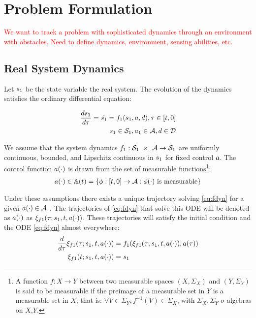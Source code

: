 \section{Problem Formulation \label{sec:formulation}}

\textcolor{red}{We want to track a problem with sophisticated dynamics through an environment with obstacles.  Need to define dynamics, environment, sensing abilities, etc.}

\subsection{Real System Dynamics}
Let $s_1$ be the state variable the real system. The evolution of the dynamics satisfies the ordinary differential equation:

\begin{equation}
\begin{aligned}
\label{eq:fdyn}
\frac{ds_1}{d\tau} = \dot{s_1} = f_1(s_1, a, d), \tau \in [t, 0] \\
s_1 \in \mathcal{S}_1, a_1 \in \mathcal{A}, d \in \mathcal{D}
\end{aligned}
\end{equation}

We assume that the system dynamics $f_1 : \mathcal{S}_1\ \times\ \mathcal{A} \rightarrow \mathcal{S}_1$ are uniformly continuous, bounded, and Lipschitz continuous in $s_1$ for fixed control $a$. The control function $a(\cdot)$ is drawn from the set of measurable functions\footnote{A function $f:X\to Y$ between two measurable spaces $(X,\Sigma_X)$ and $(Y,\Sigma_Y)$ is said to be measurable if the preimage of a measurable set in $Y$ is a measurable set in $X$, that is: $\forall V\in\Sigma_Y, f^{-1}(V)\in\Sigma_X$, with $\Sigma_X,\Sigma_Y$ $\sigma$-algebras on $X$,$Y$.}:
\begin{equation}
\begin{aligned}
a(\cdot) \in \mathbb{A}(t) = \{\phi: [t, 0] \rightarrow \mathcal{A}: \phi(\cdot) \text{ is measurable}\}
\end{aligned}
\end{equation}

Under these assumptions there exists a unique trajectory solving \ref{eq:fdyn} for a given $a(\cdot) \in \mathcal{A}$ \cite{Evans84}. The trajectories of \ref{eq:fdyn} that solve this ODE will be denoted as $a(\cdot)$ as $\xi_{f1}(\tau; s_1, t, a(\cdot))$. These trajectories will satisfy the initial condition and the ODE \ref{eq:fdyn} almost everywhere:
\begin{equation}
\label{eq:fdyn_traj}
\begin{aligned}
\frac{d}{d\tau}\xi_{f1}(\tau; s_1, t, a(\cdot)) &= f_1(\xi_{f1}(\tau; s_1, t, a(\cdot)), a(\tau)) \\
\xi_{f1}(t; s_1, t, a(\cdot)) &= s_1
\end{aligned}
\end{equation}

